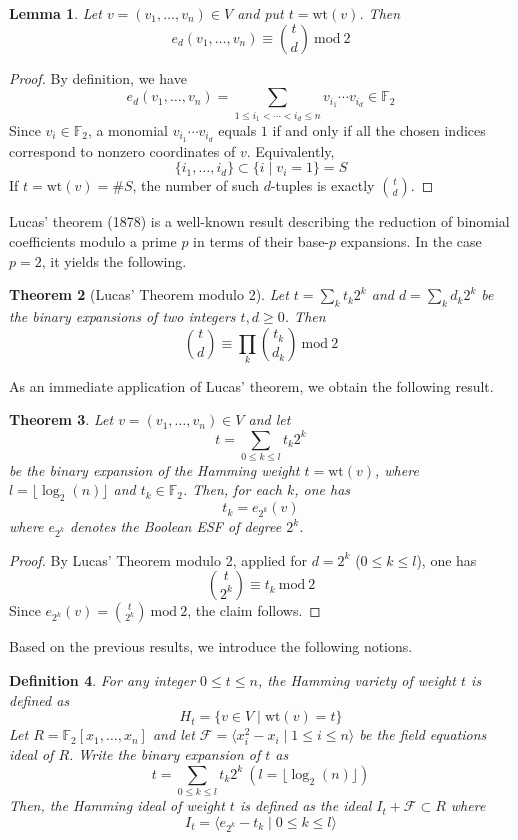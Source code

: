 \documentclass{amsart}
\newtheorem{theorem}{Theorem}[section]
\newtheorem{lemma}[theorem]{Lemma}
\newtheorem{definition}[theorem]{Definition}
\def\FF{{\mathbb F}}
\def\wt{{\mathrm{wt}}}
\def\mod{{\mathrm{mod}}}
\def\cF{{\mathcal{F}}}
\begin{document}
\begin{lemma}
\label{lemma1}
Let $v = (v_1,\ldots,v_n)\in V$ and put $t = \wt(v)$. Then
\[
e_d(v_1,\ldots,v_n)\equiv \binom{t}{d}\ \mod\ 2
\]
\end{lemma}

\begin{proof}
By definition, we have
\[
e_d(v_1,\ldots,v_n) = \sum_{1\le i_1<\cdots<i_d\le n} v_{i_1}\cdots v_{i_d}\in\FF_2
\]
Since $v_i\in\FF_2$, a monomial $v_{i_1}\cdots v_{i_d}$ equals $1$ if and only if
all the chosen indices correspond to nonzero coordinates of $v$. Equivalently,
\[
\{i_1,\ldots,i_d\}\subset \{i \mid v_i = 1\} = S
\]
If $t = \wt(v) = \# S$, the number of such $d$-tuples is exactly $\binom{t}{d}$.
\end{proof}

Lucas' theorem (1878) is a well-known result describing the reduction of binomial
coefficients modulo a prime $p$ in terms of their base-$p$ expansions. In the case $p = 2$,
it yields the following.

\begin{theorem}[Lucas' Theorem modulo 2]
Let $t = \sum_k t_k 2^k$ and $d = \sum_k d_k 2^k$ be the binary expansions of two integers
$t,d\geq 0$. Then
\[
\binom{t}{d} \equiv \prod_k \binom{t_k}{d_k}\ \mod\ 2
\]
\end{theorem}

As an immediate application of Lucas' theorem, we obtain the following result.

\begin{theorem}
\label{main1}
Let $v = (v_1,\dots,v_n)\in V$ and let
\[
t = \sum_{0\leq k\leq l}t_k 2^k
\]
be the binary expansion of the Hamming weight $t = \wt(v)$, where $l = \lfloor \log_2(n) \rfloor$
and $t_k\in\FF_2$. Then, for each $k$, one has
\[
t_k = e_{2^k}(v)
\]
where $e_{2^k}$ denotes the Boolean ESF of degree $2^k$.
\end{theorem}

\begin{proof}
By Lucas' Theorem modulo 2, applied for $d = 2^k$ ($0\leq k\leq l$), one has
\[
\binom{t}{2^k}\equiv t_k\ \mod\ 2
\]
Since $e_{2^k}(v) = \binom{t}{2^k}\ \mod\ 2$, the claim follows.
\end{proof}

Based on the previous results, we introduce the following notions.

\begin{definition}
For any integer $0\leq t\leq n$, the {\em Hamming variety of weight $t$}
is defined as
\[
H_t = \{ v \in V \mid \wt(v) = t \}
\]
Let $R = \FF_2[x_1,\ldots,x_n]$ and let $\cF = \langle x_i^2 - x_i \mid 1\leq i\leq n \rangle$
be the {\em field equations ideal} of $R$. Write the binary expansion of $t$ as
\[
t = \sum_{0\leq k\leq l} t_k 2^k\ (l = \lfloor \log_2(n) \rfloor)
\]
Then, the {\em Hamming ideal of weight $t$} is defined as the ideal $I_t + \cF \subset R$
where
\[
I_t = \langle e_{2^k} - t_k \mid 0\leq k\leq l \rangle
\]
\end{definition}
\end{document}
